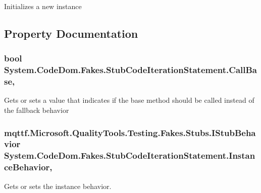 Initializes a new instance



\subsection{Property Documentation}
\hypertarget{class_system_1_1_code_dom_1_1_fakes_1_1_stub_code_iteration_statement_af1734cc514f4157b2f1f606e44293d0d}{
\subsubsection[{Call\-Base}]{\setlength{\rightskip}{0pt plus 5cm}bool System.\-Code\-Dom.\-Fakes.\-Stub\-Code\-Iteration\-Statement.\-Call\-Base\hspace{0.3cm}{\ttfamily [get]}, {\ttfamily [set]}}}\label{class_system_1_1_code_dom_1_1_fakes_1_1_stub_code_iteration_statement_af1734cc514f4157b2f1f606e44293d0d}


Gets or sets a value that indicates if the base method should be called instead of the fallback behavior

\hypertarget{class_system_1_1_code_dom_1_1_fakes_1_1_stub_code_iteration_statement_a2563dba3ddebea8189db1b14b1f583d0}{
\subsubsection[{Instance\-Behavior}]{\setlength{\rightskip}{0pt plus 5cm}mqttf.\-Microsoft.\-Quality\-Tools.\-Testing.\-Fakes.\-Stubs.\-I\-Stub\-Behavior System.\-Code\-Dom.\-Fakes.\-Stub\-Code\-Iteration\-Statement.\-Instance\-Behavior\hspace{0.3cm}{\ttfamily [get]}, {\ttfamily [set]}}}\label{class_system_1_1_code_dom_1_1_fakes_1_1_stub_code_iteration_statement_a2563dba3ddebea8189db1b14b1f583d0}


Gets or sets the instance behavior.

